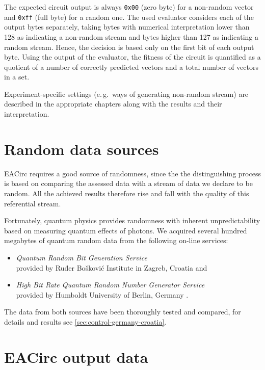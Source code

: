 \documentclass[12pt,twoside]{fithesis2}		%
\renewcommand{\_}{\leavevmode \kern0.0em\vbox{\hrule width0.4em}}
\newcommand{\squarebullet}{\textcolor{black}{\raisebox{0.15em}{\rule{4pt}{4pt}}}}
\newenvironment{myItemize}{
  \begin{itemize}[leftmargin=2em,rightmargin=1em,itemsep=\parskip ,parsep=0em,topsep=0em,partopsep=0em]
  \renewcommand{\labelitemi}{\squarebullet}
  \renewcommand{\labelitemii}{$\diamond$}
}{
  \end{itemize}
}
\begin{document}
The expected circuit output is always \texttt{0x00} (zero byte) for a non-random vector and \texttt{0xff} (full byte) 
for a random one.
The used evaluator considers each of the output bytes separately, taking bytes with numerical interpretation lower than
128 as indicating a non-random stream and bytes higher than 127 as indicating a random stream.
Hence, the decision is based only on the first bit of each output byte.
Using the output of the evaluator, the fitness of the circuit is quantified as a quotient of a number of 
correctly predicted vectors and a total number of vectors in a set.

Experiment-specific settings (e.\,g.\ ways of generating non-random stream) are described in the 
appropriate chapters along with the results and their interpretation.

\section{Random data sources}
\label{sec:settings-random}

EACirc requires a good source of randomness, since the the distinguishing process is based on comparing the assessed data
with a stream of data we declare to be random. All the achieved results therefore rise and fall 
with the quality of this referential stream.

Fortunately, quantum physics provides randomness with inherent unpredictability based on measuring quantum effects of photons. 
We acquired several hundred megabytes of quantum random data from the following on-line services:
\begin{myItemize}
\item \textit{Quantum Random Bit Generation Service}\\
provided by Ruđer Bošković Institute in Zagreb, Croatia \parencite{qrng-service-croatia} and
\item \textit{High Bit Rate Quantum Random Number Generator Service}\\
provided by Humboldt University of Berlin, Germany \parencite{qrng-service-germany}.
\end{myItemize}
The data from both sources have been thoroughly tested and compared, for details and results 
see \autoref{sec:control-germany-croatia}.

\section{EACirc output data}
\label{sec:settings-eacirc-output}
\end{document}
